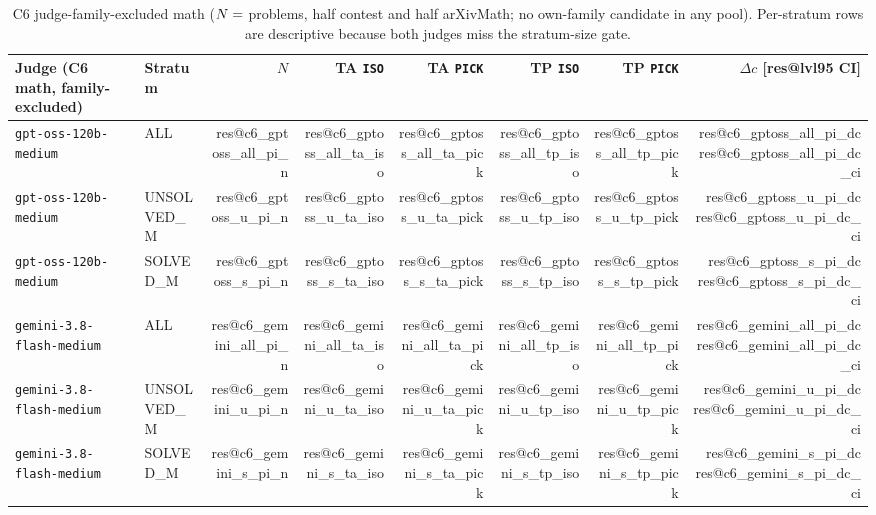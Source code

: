 \documentclass[10pt,twocolumn]{article}
\makeatletter
\newcommand{\res}[1]{\csname res@#1\endcsname}
\makeatother
\begin{document}
\begin{table}[t]
\centering\footnotesize
\setlength{\tabcolsep}{4.5pt}
\begin{tabular}{llrrrrrr}
\toprule
Judge (C6 math, family-excluded) & Stratum & $N$ & TA \texttt{ISO} & TA \texttt{PICK} & TP \texttt{ISO} & TP \texttt{PICK} & $\Delta c$ [\res{lvl95} CI] \\
\midrule
\texttt{gpt-oss-120b-medium} & ALL & \res{c6_gptoss_all_pi_n} & \res{c6_gptoss_all_ta_iso} & \res{c6_gptoss_all_ta_pick} & \res{c6_gptoss_all_tp_iso} & \res{c6_gptoss_all_tp_pick} & \res{c6_gptoss_all_pi_dc} \res{c6_gptoss_all_pi_dc_ci} \\
\texttt{gpt-oss-120b-medium} & UNSOLVED\_M & \res{c6_gptoss_u_pi_n} & \res{c6_gptoss_u_ta_iso} & \res{c6_gptoss_u_ta_pick} & \res{c6_gptoss_u_tp_iso} & \res{c6_gptoss_u_tp_pick} & \res{c6_gptoss_u_pi_dc} \res{c6_gptoss_u_pi_dc_ci} \\
\texttt{gpt-oss-120b-medium} & SOLVED\_M & \res{c6_gptoss_s_pi_n} & \res{c6_gptoss_s_ta_iso} & \res{c6_gptoss_s_ta_pick} & \res{c6_gptoss_s_tp_iso} & \res{c6_gptoss_s_tp_pick} & \res{c6_gptoss_s_pi_dc} \res{c6_gptoss_s_pi_dc_ci} \\
\midrule
\texttt{gemini-3.8-flash-medium} & ALL & \res{c6_gemini_all_pi_n} & \res{c6_gemini_all_ta_iso} & \res{c6_gemini_all_ta_pick} & \res{c6_gemini_all_tp_iso} & \res{c6_gemini_all_tp_pick} & \res{c6_gemini_all_pi_dc} \res{c6_gemini_all_pi_dc_ci} \\
\texttt{gemini-3.8-flash-medium} & UNSOLVED\_M & \res{c6_gemini_u_pi_n} & \res{c6_gemini_u_ta_iso} & \res{c6_gemini_u_ta_pick} & \res{c6_gemini_u_tp_iso} & \res{c6_gemini_u_tp_pick} & \res{c6_gemini_u_pi_dc} \res{c6_gemini_u_pi_dc_ci} \\
\texttt{gemini-3.8-flash-medium} & SOLVED\_M & \res{c6_gemini_s_pi_n} & \res{c6_gemini_s_ta_iso} & \res{c6_gemini_s_ta_pick} & \res{c6_gemini_s_tp_iso} & \res{c6_gemini_s_tp_pick} & \res{c6_gemini_s_pi_dc} \res{c6_gemini_s_pi_dc_ci} \\
\bottomrule
\end{tabular}
\caption{C6 judge-family-excluded math ($N=\res{c6_n_problems}$ problems, half contest and half arXivMath; no own-family candidate in any pool). Per-stratum rows are descriptive because both judges miss the stratum-size gate.}
\label{tab:c6math}
\end{table}
\end{document}

